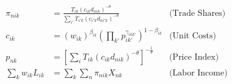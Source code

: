 \begin{align*}
    \pi_{nik} &= \frac{T_{ik} (c_{ik} d_{nik})^{-\theta}}{\sum_{i'} T_{i'k} (c_{i'k} d_{ni'k})^{-\theta}} & \text{(Trade Shares)} \\
    c_{ik} &= (w_{ik})^{\beta_{ik}} \left(\prod_{k'} p_{ik'}^{\gamma_{ikk'}}\right)^{1 - \beta_{ik}} & \text{(Unit Costs)} \\
    p_{nk} &= \left[ \sum_{i} T_{ik} (c_{ik} d_{nik})^{-\theta} \right]^{-\frac{1}{\theta}} & \text{(Price Index)} \\
   \sum_{k} w_{ik} L_{ik} &= \sum_{k} \sum_{n} \pi_{nik} X_{nk} & \text{(Labor Income)} \\
\end{align*}
